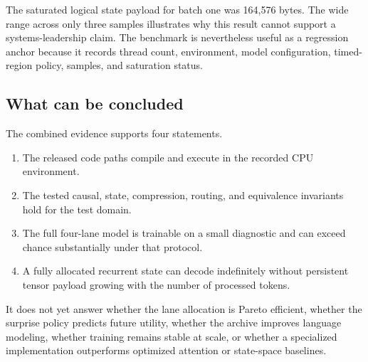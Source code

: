 The saturated logical state payload for batch one was 164,576 bytes. The wide
range across only three samples illustrates why this result cannot support a
systems-leadership claim. The benchmark is nevertheless useful as a
regression anchor because it records thread count, environment, model
configuration, timed-region policy, samples, and saturation status.

\subsection{What can be concluded}

The combined evidence supports four statements.

\begin{enumerate}
  \item The released code paths compile and execute in the recorded CPU
  environment.
  \item The tested causal, state, compression, routing, and equivalence
  invariants hold for the test domain.
  \item The full four-lane model is trainable on a small diagnostic and can
  exceed chance substantially under that protocol.
  \item A fully allocated recurrent state can decode indefinitely without
  persistent tensor payload growing with the number of processed tokens.
\end{enumerate}

It does not yet answer whether the lane allocation is Pareto efficient, whether
the surprise policy predicts future utility, whether the archive improves
language modeling, whether training remains stable at scale, or whether a
specialized implementation outperforms optimized attention or state-space
baselines.
